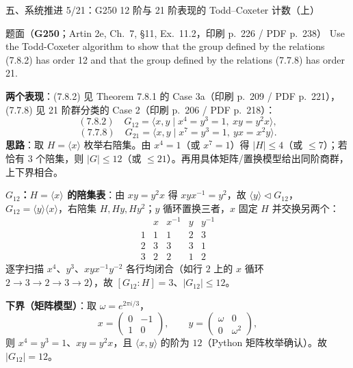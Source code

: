 \documentclass[aspectratio=169,10pt,fontset=none]{ctexbeamer}
\newcommand{\ex}[1]{\textcolor{accent}{\footnotesize\bfseries #1}}
\newcommand{\key}[1]{\textcolor{ink}{\bfseries #1}}
\begin{document}
\begin{frame}[t]{五、系统推进 5/21：G250 12 阶与 21 阶表现的 Todd–Coxeter 计数（上）}
\label{ex:G250}
\scriptsize
\setlength{\parskip}{0pt}
\begin{block}{\footnotesize 题面（\ex{G250}；Artin 2e, Ch.~7, §11, Ex.~11.2，印刷 p.~226 / PDF p.~238）}
Use the Todd-Coxeter algorithm to show that the group defined by the relations (7.8.2) has order 12 and that the group defined by the relations (7.7.8) has order 21.
\end{block}
\key{两个表现}：(7.8.2) 见 Theorem 7.8.1 的 Case 3a（印刷 p.~209 / PDF p.~221），(7.7.8) 见 21 阶群分类的 Case 2（印刷 p.~206 / PDF p.~218）：
\[ (7.8.2)\quad G_{12}=\langle x,y\mid x^4=y^3=1,\ xy=y^2x\rangle, \]
\[ (7.7.8)\quad G_{21}=\langle x,y\mid x^7=y^3=1,\ yx=x^2y\rangle. \]
\key{思路}：取 $H=\langle x\rangle$ 枚举右陪集。由 $x^4=1$（或 $x^7=1$）得 $|H|\le4$（或 $\le7$）；若恰有 $3$ 个陪集，则 $|G|\le12$（或 $\le21$）。再用具体矩阵/置换模型给出同阶商群，上下界相合。

\key{$G_{12}$：$H=\langle x\rangle$ 的陪集表}：由 $xy=y^2x$ 得 $xyx^{-1}=y^2$，故 $\langle y\rangle\triangleleft G_{12}$，$G_{12}=\langle y\rangle\langle x\rangle$，右陪集 $H,Hy,Hy^2$；$y$ 循环置换三者，$x$ 固定 $H$ 并交换另两个：
\[ \begin{array}{c|cccc}
 & x & x^{-1} & y & y^{-1}\\\hline
1 & 1 & 1 & 2 & 3\\
2 & 3 & 3 & 3 & 1\\
3 & 2 & 2 & 1 & 2
\end{array} \]
逐字扫描 $x^4$、$y^3$、$xyx^{-1}y^{-2}$ 各行均闭合（如行 $2$ 上的 $x$ 循环 $2\to3\to2\to3\to2$），故 $[G_{12}:H]=3$、$|G_{12}|\le12$。

\key{下界（矩阵模型）}：取 $\omega=e^{2\pi i/3}$，
\[ x=\begin{pmatrix}0&-1\\1&0\end{pmatrix},\qquad y=\begin{pmatrix}\omega&0\\0&\omega^2\end{pmatrix}, \]
则 $x^4=y^3=1$、$xy=y^2x$，且 $\langle x,y\rangle$ 的阶为 $12$（Python 矩阵枚举确认）。故 $|G_{12}|=12$。
\end{frame}
\end{document}
